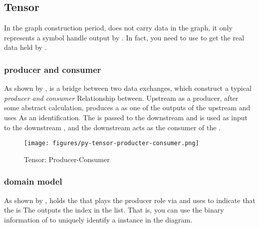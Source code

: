 \begin{content}

\subsection{Tensor}

In the graph construction period,  does not carry data in the graph, it only represents a symbol handle output by . In fact, you need to use  to get the real data held by .

\subsubsection{producer and consumer}

As shown by ,  is a bridge between two  data exchanges, which construct a typical \emph{producer and consumer} Relationship between. Upstream  as a producer, after some abstract calculation, produces a  as one of the outputs of the upstream  and uses  As an identification. The  is passed to the downstream  and is used as input to the downstream , and the downstream  acts as the consumer of the .

\begin{figure}[H]
\centering
\texttt{[image: figures/py-tensor-producter-consumer.png]}
\caption{Tensor: Producer-Consumer}
 \label{fig:py-tensor-producter-consumer}
\end{figure}

\subsubsection{domain model}

As shown by ,  holds the  that plays the producer role via  and uses  to indicate that the  is The  outputs the index in the list. That is, you can use the binary information of  to uniquely identify a  instance in the diagram.


\end{content}
